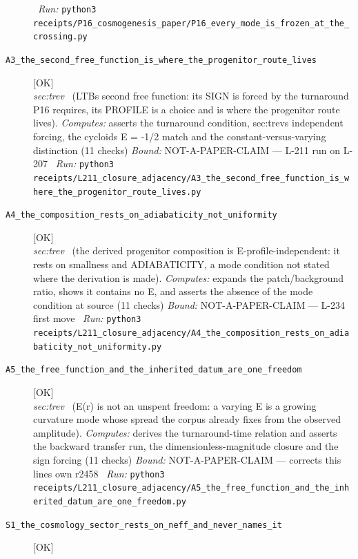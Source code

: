 \begin{description}
\ \emph{Run:} \texttt{python3 receipts/P16\_cosmogenesis\_paper/P16\_every\_mode\_is\_frozen\_at\_the\_crossing.py}
\item[\label{rcpt:A3_the_second_free_function_is_where_the_progenitor_route_lives}\textbf{}\quad\texttt{A3\_the\_second\_free\_function\_is\_where\_the\_progenitor\_route\_lives}]\hfill\textsf{[OK]}\\
\textit{sec:trev} \ (LTBs second free function: its SIGN is forced by the turnaround P16 requires, its PROFILE is a choice and is where the progenitor route lives). 
\emph{Computes:} asserts the turnaround condition, sec:trevs independent forcing, the cycloids E = -1/2 match and the constant-versus-varying distinction (11 checks)
 \emph{Bound:} NOT-A-PAPER-CLAIM --- L-211 run on L-207
\ \emph{Run:} \texttt{python3 receipts/L211\_closure\_adjacency/A3\_the\_second\_free\_function\_is\_where\_the\_progenitor\_route\_lives.py}
\item[\label{rcpt:A4_the_composition_rests_on_adiabaticity_not_uniformity}\textbf{}\quad\texttt{A4\_the\_composition\_rests\_on\_adiabaticity\_not\_uniformity}]\hfill\textsf{[OK]}\\
\textit{sec:trev} \ (the derived progenitor composition is E-profile-independent: it rests on smallness and ADIABATICITY, a mode condition not stated where the derivation is made). 
\emph{Computes:} expands the patch/background ratio, shows it contains no E, and asserts the absence of the mode condition at source (11 checks)
 \emph{Bound:} NOT-A-PAPER-CLAIM --- L-234 first move
\ \emph{Run:} \texttt{python3 receipts/L211\_closure\_adjacency/A4\_the\_composition\_rests\_on\_adiabaticity\_not\_uniformity.py}
\item[\label{rcpt:A5_the_free_function_and_the_inherited_datum_are_one_freedom}\textbf{}\quad\texttt{A5\_the\_free\_function\_and\_the\_inherited\_datum\_are\_one\_freedom}]\hfill\textsf{[OK]}\\
\textit{sec:trev} \ (E(r) is not an unspent freedom: a varying E is a growing curvature mode whose spread the corpus already fixes from the observed amplitude). 
\emph{Computes:} derives the turnaround-time relation and asserts the backward transfer run, the dimensionless-magnitude closure and the sign forcing (11 checks)
 \emph{Bound:} NOT-A-PAPER-CLAIM --- corrects this lines own r2458
\ \emph{Run:} \texttt{python3 receipts/L211\_closure\_adjacency/A5\_the\_free\_function\_and\_the\_inherited\_datum\_are\_one\_freedom.py}
\item[\label{rcpt:S1_the_cosmology_sector_rests_on_neff_and_never_names_it}\textbf{}\quad\texttt{S1\_the\_cosmology\_sector\_rests\_on\_neff\_and\_never\_names\_it}]\hfill\textsf{[OK]}\\

\end{description}
